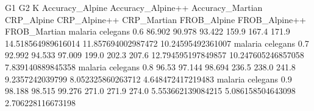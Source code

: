 G1 G2 K Accuracy_Alpine Accuracy_Alpine++ Accuracy_Martian CRP_Alpine CRP_Alpine++ CRP_Martian FROB_Alpine FROB_Alpine++ FROB_Martian
malaria celegans 0.6 86.902 90.978 93.422 159.9 167.4 171.9 14.518564989616014 11.857694002987472 10.24595492361007
malaria celegans 0.7 92.992 94.533 97.009 199.0 202.3 207.6 12.794595197849857 10.247605246857058 7.839140889845358
malaria celegans 0.8 96.53 97.144 98.694 236.5 238.0 241.8 9.2357242039799 8.052325860263712 4.648472417219483
malaria celegans 0.9 98.188 98.515 99.276 271.0 271.9 274.0 5.553662139084215 5.086158504643098 2.706228116673198
